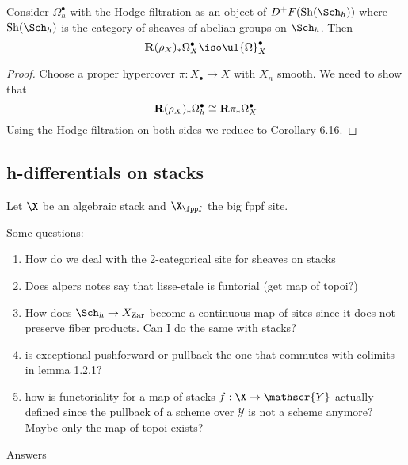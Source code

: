 \documentclass[12pt]{article}
\newcommand{\Y}{\mathscr{Y}}
\begin{document}
\begin{theorem}
Consider $\Omega^\bullet_h$ with the Hodge filtration as an object of $D^+ F(\Sh(\Sch_h))$ where $\Sh(\Sch_h)$ is the category of sheaves of abelian groups on $\Sch_h$. Then
\[ \R (\rho_X)_* \Omega^\bullet_X \iso \ul{\Omega}_X^\bullet \]
\end{theorem}

\begin{proof}
Choose a proper hypercover $\pi : X_\bullet \to X$ with $X_n$ smooth. We need to show that
\[ \mathbf{R} (\rho_X)_* \Omega_h^\bullet \cong \mathbf{R} \pi_* \Omega^\bullet_X \]
Using the Hodge filtration on both sides  we reduce to Corollary 6.16.
\end{proof}

\subsection{h-differentials on stacks}


Let $\X$ be an algebraic stack and $\X_{\fppf}$ the big fppf site.

Some questions: 

\begin{enumerate}
\item How do we deal with the 2-categorical site for sheaves on stacks
\item Does alpers notes say that lisse-etale is funtorial (get map of topoi?)
\item How does $\Sch_h \to X_{\Zar}$ become a continuous map of sites since it does not preserve fiber products. Can I do the same with stacks?
\item is exceptional pushforward or pullback the one that commutes with colimits in lemma 1.2.1?
\item how is functoriality for a map of stacks $f : \X \to \Y$ actually defined since the pullback of a scheme \etale over $\Y$ is not a scheme anymore? Maybe only the map of topoi exists? 
\end{enumerate}

Answers
\end{document}
